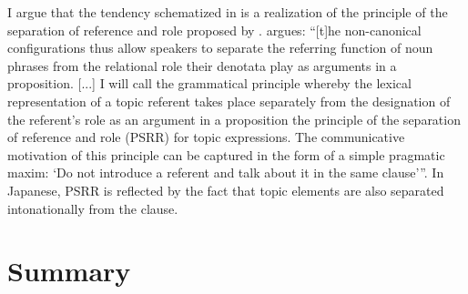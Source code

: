 %

I argue that the tendency schematized in \Last is a realization
of the principle of the separation of reference and role proposed by
.
 argues:
``[t]he non-canonical configurations thus allow speakers to separate the {\sc referring} function of noun phrases from the {\sc relational} role their denotata play as arguments in a proposition. [...]
I will call the grammatical principle whereby the lexical representation of a topic referent takes place separately from the designation of the referent's role as an argument in a proposition the {\sc principle of the separation of reference and role} (PSRR) for topic expressions. The communicative motivation of this principle can be captured in the form of a simple pragmatic maxim:
`Do not introduce a referent and talk about it in the same clause'''.
In Japanese,
PSRR is reflected by the fact that
topic elements are also separated intonationally from the clause.


\section{Summary}

